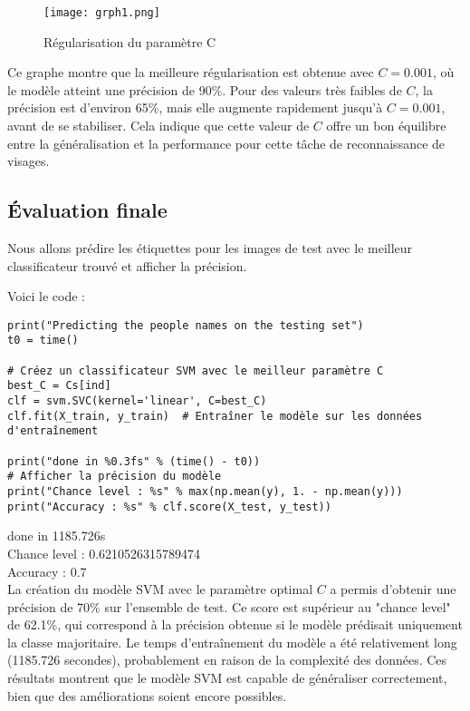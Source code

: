 \documentclass{article}
\begin{document}
\begin{itemize}
\begin{figure}[H]
    \centering
    \begin{minipage}{0.9\textwidth}
        \centering
        \texttt{[image: grph1.png]}
        \caption{Régularisation du paramètre C}
    \end{minipage}
    \end{figure}
Ce graphe montre que la meilleure régularisation est obtenue avec \( C =
0.001 \), où le modèle atteint une précision de 90\%. Pour des valeurs 
très faibles de \( C \), la précision est d'environ 65\%, mais elle 
augmente rapidement jusqu'à \( C = 0.001 \), avant de se stabiliser. Cela 
indique que cette valeur de \( C \) offre un bon équilibre entre la 
généralisation et la performance pour cette tâche de reconnaissance de 
visages.


\subsection{Évaluation finale}

Nous allons prédire les étiquettes pour les images de test avec le
meilleur classificateur trouvé et afficher la précision.


Voici le code :

\begin{verbatim}
print("Predicting the people names on the testing set")
t0 = time()

# Créez un classificateur SVM avec le meilleur paramètre C
best_C = Cs[ind]
clf = svm.SVC(kernel='linear', C=best_C)
clf.fit(X_train, y_train)  # Entraîner le modèle sur les données d'entraînement

print("done in %0.3fs" % (time() - t0))
# Afficher la précision du modèle
print("Chance level : %s" % max(np.mean(y), 1. - np.mean(y)))
print("Accuracy : %s" % clf.score(X_test, y_test))
\end{verbatim}
done in 1185.726s\\
Chance level : 0.6210526315789474\\
Accuracy : 0.7\\
La création du modèle SVM avec le paramètre optimal \(C\) a permis 
d'obtenir une précision de 70\% sur l'ensemble de test. Ce score est 
supérieur au "chance level" de 62.1\%, qui correspond à la précision 
obtenue si le modèle prédisait uniquement la classe majoritaire. Le temps 
d'entraînement du modèle a été relativement long (1185.726 secondes), 
probablement en raison de la complexité des données. Ces résultats 
montrent que le modèle SVM est capable de généraliser correctement, bien 
que des améliorations soient encore possibles.


\end{itemize}
\end{document}
